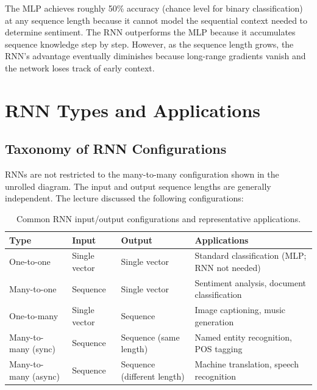 \documentclass[12pt,a4paper]{article}
\begin{document}
The MLP achieves roughly 50\% accuracy (chance level for binary classification)
at any sequence length because it cannot model the sequential context needed to
determine sentiment.  The RNN outperforms the MLP because it accumulates
sequence knowledge step by step.  However, as the sequence length grows, the
RNN's advantage eventually diminishes because long-range gradients vanish and
the network loses track of early context.

\section{RNN Types and Applications}
\label{sec:rnn_types}

\subsection{Taxonomy of RNN Configurations}
\label{subsec:rnn_taxonomy}

RNNs are not restricted to the many-to-many configuration shown in the unrolled
diagram.  The input and output sequence lengths are generally independent.  The
lecture discussed the following configurations:

\begin{table}[ht]
\centering
\caption{Common RNN input/output configurations and representative applications.}
\label{tab:rnn_configs}
\renewcommand{\arraystretch}{1.4}
\begin{tabularx}{\textwidth}{@{}lllX@{}}
\toprule
\textbf{Type} & \textbf{Input} & \textbf{Output} & \textbf{Applications} \\
\midrule
One-to-one     & Single vector & Single vector &
  Standard classification (MLP; RNN not needed) \\
Many-to-one    & Sequence      & Single vector &
  Sentiment analysis, document classification \\
One-to-many    & Single vector & Sequence      &
  Image captioning, music generation \\
Many-to-many (sync) & Sequence & Sequence (same length) &
  Named entity recognition, POS tagging \\
Many-to-many (async) & Sequence & Sequence (different length) &
  Machine translation, speech recognition \\
\bottomrule
\end{tabularx}
\end{table}
\end{document}
